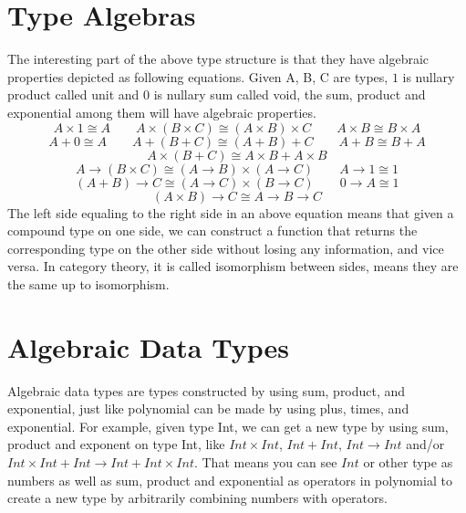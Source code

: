 \documentclass{article}
\begin{document}
\section{Type Algebras}
The interesting part of the above type structure is that they have algebraic properties depicted as following equations. Given A, B, C are types, $1$ is nullary product called unit and $0$ is nullary sum called void, the sum, product and exponential among them will have algebraic properties.
\begin{equation*}
A \times 1 \cong A
\qquad
A \times ( B \times C ) \cong ( A \times B ) \times C
\qquad
A \times  B \cong B \times A
\end{equation*}
\begin{equation*}
A + 0 \cong A
\qquad
A + ( B + C ) \cong ( A + B ) + C
\qquad
A +  B \cong B + A
\end{equation*}
\begin{equation*}
A \times ( B + C ) \cong A \times B + A \times B
\end{equation*}
\begin{equation*}
A \rightarrow ( B \times C ) \cong (A \rightarrow B) \times (A \rightarrow C)
\qquad
A \rightarrow 1 \cong 1
\end{equation*}
\begin{equation*}
(A +  B) \rightarrow C \cong (A \rightarrow C) \times (B \rightarrow C)
\qquad
0 \rightarrow A \cong 1
\end{equation*}
\begin{equation*}
(A \times  B) \rightarrow C \cong A \rightarrow B \rightarrow C
\end{equation*}
The left side equaling to the right side in an above equation means that given a compound type on one side, we can construct a function that returns the corresponding type on the other side without losing any information, and vice versa. In category theory, it is called isomorphism between sides, means they are the same up to isomorphism.

\section{Algebraic Data Types}
Algebraic data types are types constructed by using sum, product, and exponential, just like polynomial can be made by using plus, times, and exponential. For example, given type Int, we can get a new type by using sum, product and exponent on type Int, like $Int \times Int$, $Int + Int$, $Int \rightarrow Int$ and/or $Int \times Int + Int \rightarrow Int + Int \times Int$. That means you can see $Int$ or other type as numbers as well as sum, product and exponential as operators in polynomial to create a new type by arbitrarily combining numbers with operators. 
\end{document}
